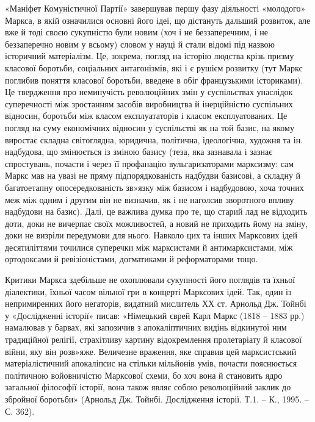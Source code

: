 \documentclass{kapital}
\begin{document}
     «Маніфет Комуністичної Партії»  завершував першу фазу діяльності «молодого» Маркса, в якій означилися основні його ідеї, що дістануть дальший розвиток, але вже й тоді своєю сукупністю були новим (хоч і не беззаперечним, і не беззаперечно новим у всьому) словом у науці й стали відомі під назвою історичний матеріалізм. Це, зокрема, погляд на історію людства крізь призму класової боротьби, соціальних антагонізмів, які і є рушієм розвитку (тут Маркс поглибив поняття класової боротьби, введене в обіг французькими істориками). Це твердження про неминучість революційних змін у суспільствах унаслідок суперечності між зростанням засобів виробництва й інерційністю суспільних відносин,  боротьби між класом експлуататорів і класом експлуатованих. Це погляд на суму економічних відносин у суспільстві як на той базис, на якому виростає складна світоглядна, юридична,  політична, ідеологічна, художня та ін. надбудова, що змінюється із зміною базису (теза, яка зазнавала і зазнає спростувань, почасти і через її профанацію вульгаризаторами марксизму: сам Маркс мав на увазі не пряму підпорядкованість надбудви базисові, а складну й багатоетапну опосередкованість зв»язку між базисом і надбудовою, хоча точних меж між одним і другим він не визначив, як і не наголсив зворотного впливу надбудови на базис). Далі, це важлива думка про те, що старий лад не відходить доти, доки не вичерпає своїх можливостей, а новий не приходить йому на зміну, доки не визріли передумови для нього. Навколо цих та інших Марксових ідей десятиліттями точилися суперечки між марксистами й антимарксистами, між ортодоксами й ревізіоністами, догматиками й реформаторами тощо.
 
	Критики Маркса здебільше не охоплювали сукупності його поглядів та їхньої діалектики, їхньої часом вільної гри в концерті Марксових ідей. Так, один із непримиренних його негаторів, видатний мислитель ХХ ст.  Арнольд Дж. Тойнбі у «Дослідженні історії» писав: 		   «Німецький єврей Карл Маркс (1818 – 1883 рр.) намалював у барвах, які запозичив з апокаліптичних видінь відкинутої ним традиційної релігії, страхітливу картину відокремлення пролетаріату й класової війни, яку він розв»яже. Величезне враження, яке справив цей марксистський матеріалістичний апокаліпсис на стільки мільйонів умів, почасти пояснюється політичною войовничістю Марксової схеми, бо хоч вона й становить ядро загальної філософії історії, вона також являє собою революційний заклик до збройної боротьби» (Арнольд Дж. Тойнбі. Дослідження історії. Т.1. – К., 1995. – С. 362). 
 
\end{document}
